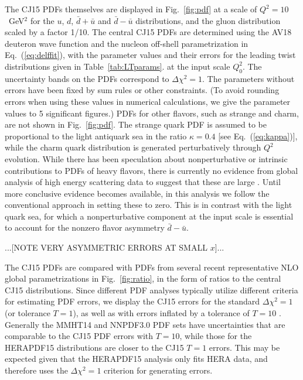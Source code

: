 \documentclass[aps,prd,amsmath,preprint]{revtex4}
\begin{document}
The CJ15 PDFs themselves are displayed in Fig.~\ref{fig:pdf} at a
scale of $Q^2=10$~GeV$^2$ for the $u$, $d$, $\bar d + \bar u$ and
$\bar d - \bar u$ distributions, and the gluon distribution scaled
by a factor 1/10.  The central CJ15 PDFs are determined using the
AV18 deuteron wave function and the nucleon off-shell parametrization
in Eq.~(\ref{eq:delffit}), with the parameter values and their errors
for the leading twist distributions given in Table~\ref{tab:LTparams}.
at the input scale $Q_0^2$.  The uncertainty bands on the PDFs
correspond to $\Delta\chi^2=1$.  The parameters without errors
have been fixed by sum rules or other constraints.
(To avoid rounding errors when using these values in numerical
calculations, we give the parameter values to 5 significant figures.)
%
PDFs for other flavors, such as strange and charm, are not shown
in Fig.~\ref{fig:pdf}.  The strange quark PDF is assumed to be
proportional to the light antiquark sea in the ratio $\kappa = 0.4$
[see Eq.~(\ref{eq:kappa})], while the charm quark distribution is
generated perturbatively through $Q^2$ evolution.
While there has been speculation about nonperturbative or intrinsic
contributions to PDFs of heavy flavors, there is currently no evidence
from global analysis of high energy scattering data to suggest that
these are large \cite{PedroIC15}.  Until more conclusive evidence
becomes available, in this analysis we follow the conventional
approach in setting these to zero.
This is in contrast with the light quark sea, for which a
nonperturbative component at the input scale is essential to
account for the nonzero flavor asymmetry $\bar d-\bar u$.

{\color{red} ...[NOTE VERY ASYMMETRIC ERRORS AT SMALL $x$]...}    


The CJ15 PDFs are compared with PDFs from several recent representative
NLO global parametrizations in Fig.~\ref{fig:ratio}, in the form of
ratios to the central CJ15 distributions.  Since different PDF analyses
typically utilize different criteria for estimating PDF errors, we
display the CJ15 errors for the standard $\Delta\chi^2=1$ (or tolerance
$T=1$), as well as with errors inflated by a tolerance of $T=10$
\cite{CJ12}.
Generally the MMHT14 \cite{MMHT14} and NNPDF3.0 \cite{NNPDF3.0} PDF
sets have uncertainties that are comparable to the CJ15 PDF errors with
$T=10$, while those for the HERAPDF15 \cite{HERAPDF15} distributions
are closer to the CJ15 $T=1$ errors.  This may be expected given that
the HERAPDF15 analysis only fits HERA data, and therefore uses the
$\Delta\chi^2=1$ criterion for generating errors.
\end{document}
